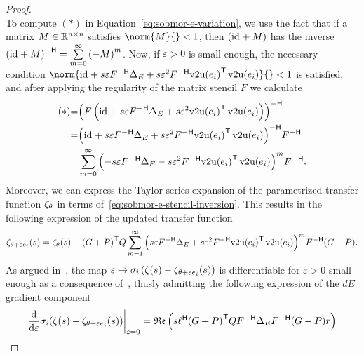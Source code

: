 \begin{proof}
\begin{equation}
    \end{equation}
    To compute $(*)$ in Equation~\eqref{eq:sobmor-e-variation}, we use the fact that if a matrix $M \in \mathbb{R}^{n \times n}$ satisfies $\norm{M}{} < 1$, then $(\text{id}_{} + M)$ has the inverse ${(\id + M)}\inv = \sum\limits_{m = 0}^\infty {(-M)}^m$.
    Now, if $\varepsilon > 0$ is small enough, the necessary condition $\norm{\id + s \varepsilon F\inv \Delta_E + s \varepsilon^2 F\inv {\vecupper(e_i)}\trans \vecupper(e_i)}{} < 1$ is satisfied, and after applying the regularity of the matrix stencil $F$ we calculate
    \begin{equation}\label{eq:sobmor-e-stencil-inversion}
        \begin{alignedat}{3}
            &(*) &= &{\left( F \left( \id + s \varepsilon F\inv \Delta_E + s \varepsilon^2 {\vecupper(e_i)}\trans \vecupper(e_i) \right) \right)}\inv \\
            & &= &{\left( \id + s \varepsilon F\inv \Delta_E + s \varepsilon^2 F\inv {\vecupper(e_i)}\trans \vecupper(e_i) \right)}\inv F\inv \\
            & &= &\sum\limits_{m = 0}^\infty {\left( - s \varepsilon F\inv \Delta_E - s \varepsilon^2 F\inv {\vecupper(e_i)}\trans \vecupper(e_i) \right)}^m F\inv.
        \end{alignedat}
    \end{equation}
    Moreover, we can express the Taylor series expansion of the parametrized transfer function $\zeta_\theta$ in terms of~\eqref{eq:sobmor-e-stencil-inversion}.
    This results in the following expression of the updated transfer function
    \begin{equation}\label{eq:sobmor-e-taylor}
        \tfunc_{\theta + \varepsilon e_i}(s) = \tfunc_\theta(s) - {(G + P)}\trans Q \sum\limits_{m = 1}^\infty {\left( s \varepsilon F\inv \Delta_E + s \varepsilon^2 F\inv {\vecupper(e_i)}\trans \vecupper(e_i) \right)}^m F\inv (G - P).
    \end{equation}
    As argued in~\cite[Theorem~1]{Schwerdtner2023}, the map $\varepsilon \mapsto \sigma_i\left( \zeta(s) - \zeta_{\theta + \varepsilon e_i}(s) \right)$ is differentiable for $\varepsilon > 0$ small enough as a consequence of~\cite{Lancaster1964}, thusly admitting the following expression of the $dE$ gradient component
    \begin{equation}\label{eq:sobmor-e-trace-form}
        \begin{aligned}
            \res{\frac{\dif}{\dif \varepsilon} \sigma_i(\tfunc(s) - \tfunc_{\theta + \varepsilon e_i}(s))}{\varepsilon = 0} &= \re{s \ell\herm {(G + P)}\trans Q F\inv \Delta_E F\inv (G - P) r} \\

\end{aligned}
\end{equation}
\end{proof}
